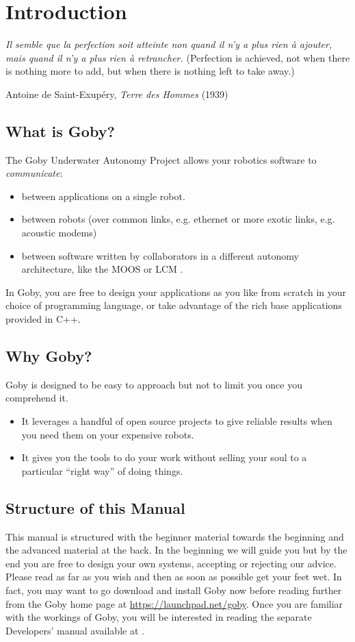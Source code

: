\chapter{Introduction}
\setlength{\epigraphwidth}{0.5\textwidth}
\epigraph{\textit{Il semble que la perfection soit atteinte non quand il n'y a plus rien à ajouter, mais quand il n'y a plus rien à retrancher.} (Perfection is achieved, not when there is nothing more to add, but when there is nothing left to take away.)}{Antoine de Saint-Exupéry, \textit{Terre des Hommes} (1939)}

\section{What is Goby?}

The Goby Underwater Autonomy Project allows your robotics software to \textit{communicate}: 
\begin{itemize}
\item between \glspl{application} on a single robot.
\item between robots (over common links, e.g. ethernet or more exotic links, e.g. acoustic modems)
\item between software written by collaborators in a different \gls{autonomy architecture}, like the MOOS \cite{moos} or LCM \cite{lcm}. 
\end{itemize}

In Goby, you are free to design your applications as you like from scratch in your choice of programming language, or take advantage of the rich base applications provided in C++.

\section{Why Goby?}

Goby is designed to be easy to approach but not to limit you once you comprehend it. 
\begin{itemize}
\item It leverages a handful of open source projects to give reliable results when you need them on your expensive robots. 
\item It gives you the tools to do your work without selling your soul to a particular ``right way'' of doing things. 
\end{itemize}

\section{Structure of this Manual}
This manual is structured with the beginner material towards the beginning and the advanced material at the back. 
In the beginning we will guide you but by the end you are free to design your own systems, accepting or rejecting our advice. Please read as far as you wish and then as soon as possible get your feet wet. In fact, you may want to go download and install Goby now before reading further from the Goby home page at \url{https://launchpad.net/goby}. Once you are familiar with the workings of Goby, you will be interested in reading the separate Developers' manual available at \cite{goby-doc}.

